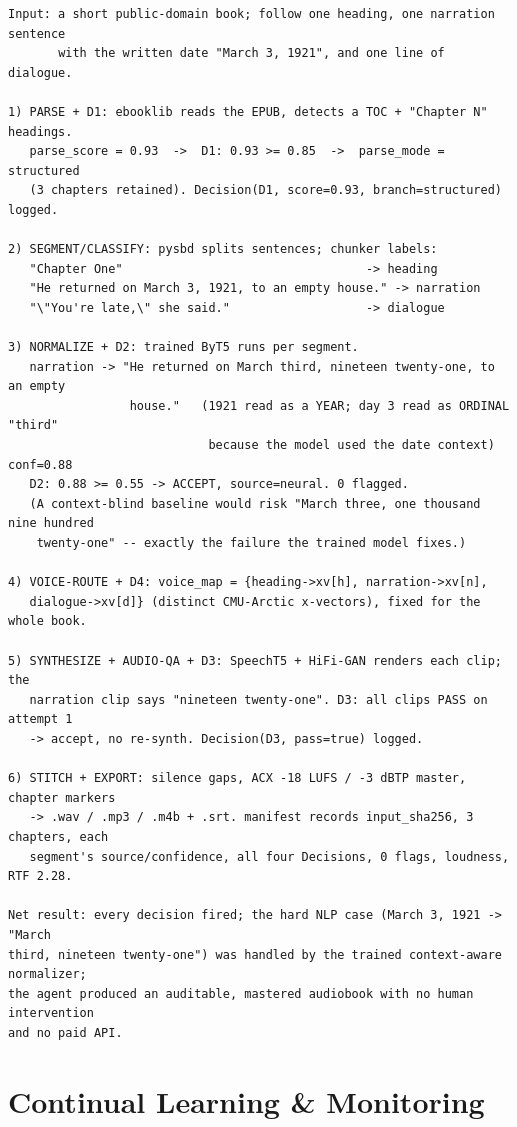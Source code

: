 \documentclass[12pt,a4paper]{article}
\begin{document}
\begin{lstlisting}[basicstyle=\ttfamily\footnotesize]
Input: a short public-domain book; follow one heading, one narration sentence
       with the written date "March 3, 1921", and one line of dialogue.

1) PARSE + D1: ebooklib reads the EPUB, detects a TOC + "Chapter N" headings.
   parse_score = 0.93  ->  D1: 0.93 >= 0.85  ->  parse_mode = structured
   (3 chapters retained). Decision(D1, score=0.93, branch=structured) logged.

2) SEGMENT/CLASSIFY: pysbd splits sentences; chunker labels:
   "Chapter One"                                  -> heading
   "He returned on March 3, 1921, to an empty house." -> narration
   "\"You're late,\" she said."                   -> dialogue

3) NORMALIZE + D2: trained ByT5 runs per segment.
   narration -> "He returned on March third, nineteen twenty-one, to an empty
                 house."   (1921 read as a YEAR; day 3 read as ORDINAL "third"
                            because the model used the date context) conf=0.88
   D2: 0.88 >= 0.55 -> ACCEPT, source=neural. 0 flagged.
   (A context-blind baseline would risk "March three, one thousand nine hundred
    twenty-one" -- exactly the failure the trained model fixes.)

4) VOICE-ROUTE + D4: voice_map = {heading->xv[h], narration->xv[n],
   dialogue->xv[d]} (distinct CMU-Arctic x-vectors), fixed for the whole book.

5) SYNTHESIZE + AUDIO-QA + D3: SpeechT5 + HiFi-GAN renders each clip; the
   narration clip says "nineteen twenty-one". D3: all clips PASS on attempt 1
   -> accept, no re-synth. Decision(D3, pass=true) logged.

6) STITCH + EXPORT: silence gaps, ACX -18 LUFS / -3 dBTP master, chapter markers
   -> .wav / .mp3 / .m4b + .srt. manifest records input_sha256, 3 chapters, each
   segment's source/confidence, all four Decisions, 0 flags, loudness, RTF 2.28.

Net result: every decision fired; the hard NLP case (March 3, 1921 -> "March
third, nineteen twenty-one") was handled by the trained context-aware normalizer;
the agent produced an auditable, mastered audiobook with no human intervention
and no paid API.
\end{lstlisting}

\section{Continual Learning \& Monitoring}
\end{document}
